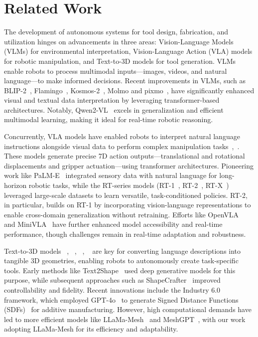 \section{Related Work}
The development of autonomous systems for tool design, fabrication, and utilization hinges on advancements in three areas: Vision-Language Models (VLMs) for environmental interpretation, Vision-Language Action (VLA) models for robotic manipulation, and Text-to-3D models for tool generation. VLMs enable robots to process multimodal inputs—images, videos, and natural language—to make informed decisions. Recent improvements in VLMs, such as BLIP-2~\cite{li2023blip}, Flamingo~\cite{alayrac2022flamingo}, Kosmos-2~\cite{peng2023kosmos}, Molmo and pixmo~\cite{deitke2024molmo}, have significantly enhanced visual and textual data interpretation by leveraging transformer-based architectures. Notably, Qwen2-VL~\cite{wang2024qwen2} excels in generalization and efficient multimodal learning, making it ideal for real-time robotic reasoning.

Concurrently, VLA models have enabled robots to interpret natural language instructions alongside visual data to perform complex manipulation tasks~\cite{gbagbe2024bi},~\cite{khan2025shake}. These models generate precise 7D action outputs—translational and rotational displacements and gripper actuation—using transformer architectures. Pioneering work like PaLM-E~\cite{driess2023palm} integrated sensory data with natural language for long-horizon robotic tasks, while the RT-series models (RT-1~\cite{brohan2022rt}, RT-2~\cite{brohan2023rt}, RT-X~\cite{o2023open}) leveraged large-scale datasets to learn versatile, task-conditioned policies. RT-2, in particular, builds on RT-1 by incorporating vision-language representations to enable cross-domain generalization without retraining. Efforts like OpenVLA~\cite{kim2024openvla} and MiniVLA~\cite{belkhale2024minivla} have further enhanced model accessibility and real-time performance, though challenges remain in real-time adaptation and robustness.

Text-to-3D models ~\cite{liu2022towards}, ~\cite{jain2022zero}, ~\cite{yu2023text}, ~\cite{liu2024sherpa3d} are key for converting language descriptions into tangible 3D geometries, enabling robots to autonomously create task-specific tools. Early methods like Text2Shape~\cite{chen2019text2shape} used deep generative models for this purpose, while subsequent approaches such as ShapeCrafter~\cite{fu2022shapecrafter} improved controllability and fidelity. Recent innovations include the Industry 6.0 framework, which employed GPT-4o~\cite{openai2024gpt4technicalreport} to generate Signed Distance Functions (SDFs)~\cite{osher2004level} for additive manufacturing. However, high computational demands have led to more efficient models like LLaMa-Mesh~\cite{wang2024llama} and MeshGPT~\cite{siddiqui2024meshgpt}, with our work adopting LLaMa-Mesh for its efficiency and adaptability.

